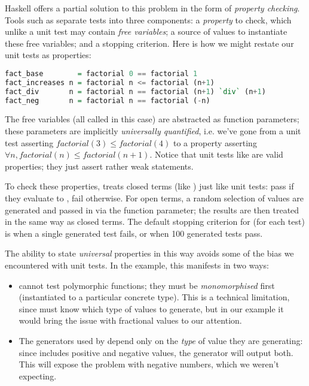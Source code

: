 Haskell offers a partial solution to this problem in the form of \emph{property checking}. Tools such as \qcheck{} separate tests into three components: a \emph{property} to check, which unlike a unit test may contain \emph{free variables}; a source of values to instantiate these free variables; and a stopping criterion. Here is how we might restate our unit tests as properties:

\begin{lstlisting}[language=Haskell, xleftmargin=.2\textwidth, xrightmargin=.2\textwidth]
fact_base        = factorial 0 == factorial 1
fact_increases n = factorial n <= factorial (n+1)
fact_div       n = factorial n == factorial (n+1) `div` (n+1)
fact_neg       n = factorial n == factorial (-n)
\end{lstlisting}

The free variables (all called  in this case) are abstracted as function parameters; these parameters are implicitly \emph{universally quantified}, i.e. we've gone from a unit test asserting $factorial(3) \leq factorial(4)$ to a property asserting $\forall n, factorial(n) \leq factorial(n+1)$. Notice that unit tests like  are valid properties; they just assert rather weak statements.

To check these properties, \qcheck{} treats closed terms (like ) just like unit tests: pass if they evaluate to , fail otherwise. For open terms, a random selection of values are generated and passed in via the function parameter; the results are then treated in the same way as closed terms. The default stopping criterion for \qcheck{} (for each test) is when a single generated test fails, or when 100 generated tests pass.

The ability to state \emph{universal} properties in this way avoids some of the bias we encountered with unit tests. In the  example, this manifests in two ways:

\begin{itemize}
  \item \qcheck{} cannot test polymorphic functions; they must be \emph{monomorphised} first (instantiated to a particular concrete type). This is a technical limitation, since \qcheck{} must know which type of values to generate, but in our example it would bring the issue with fractional values to our attention.

  \item The generators used by \qcheck{} depend only on the \emph{type} of value they are generating: since  includes positive and negative values, the  generator will output both. This will expose the problem with negative numbers, which we weren't expecting.
\end{itemize}

